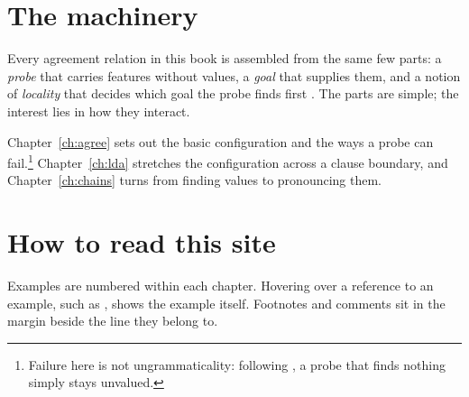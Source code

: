 
\begin{abstract}
What this project is about, and how it is put together: agreement as a family of dependencies built from a small number of moving parts.
\end{abstract}
\label{ch:intro}

\section{The machinery}\label{sec:machinery}

Every agreement relation in this book is assembled from the same few parts: a \emph{probe} that carries features without values, a \emph{goal} that supplies them, and a notion of \emph{locality} that decides which goal the probe finds first \citep{chomsky2000}. The parts are simple; the interest lies in how they interact.

Chapter~\ref{ch:agree} sets out the basic configuration and the ways a probe can fail.\footnote{Failure here is not ungrammaticality: following \citet{preminger2014}, a probe that finds nothing simply stays unvalued.} Chapter~\ref{ch:lda} stretches the configuration across a clause boundary, and Chapter~\ref{ch:chains} turns from finding values to pronouncing them.

\section{How to read this site}\label{sec:reading}

Examples are numbered within each chapter. Hovering over a reference to an example, such as , shows the example itself. Footnotes and comments sit in the margin beside the line they belong to.
